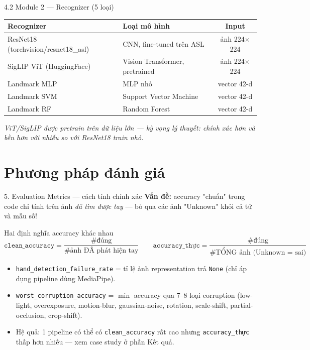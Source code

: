 \documentclass[t, aspectratio=169]{beamer} %
\begin{document}
	\begin{frame}{4.2 Module 2 — Recognizer (5 loại)}
		\begin{table}
			\small
			\centering
			\begin{tabular}{llc}
				\toprule
				\textbf{Recognizer} & \textbf{Loại mô hình} & \textbf{Input} \\
				\midrule
				ResNet18 (torchvision/resnet18\_asl) & CNN, fine-tuned trên ASL & ảnh 224$\times$224 \\
				SigLIP ViT (HuggingFace) & Vision Transformer, pretrained & ảnh 224$\times$224 \\
				Landmark MLP & MLP nhỏ & vector 42-d \\
				Landmark SVM & Support Vector Machine & vector 42-d \\
				Landmark RF & Random Forest & vector 42-d \\
				\bottomrule
			\end{tabular}
		\end{table}
		\vspace{1em}
		\textit{ViT/SigLIP được pretrain trên dữ liệu lớn — kỳ vọng lý thuyết: chính xác hơn và bền hơn với nhiễu so với ResNet18 train nhỏ.}
	\end{frame}

	\useThickBar
	\useStyleLogoOnly
	\section{Phương pháp đánh giá}
	\begin{frame}{5. Evaluation Metrics — cách tính chính xác}
		\textbf{Vấn đề:} accuracy "chuẩn" trong code chỉ tính trên ảnh \textit{đã tìm được tay} — bỏ qua các ảnh "Unknown" khỏi cả tử và mẫu số!

		\begin{block}{Hai định nghĩa accuracy khác nhau}
			\[
				\texttt{clean\_accuracy} = \frac{\#\text{đúng}}{\#\text{ảnh ĐÃ phát hiện tay}} \qquad
				\texttt{accuracy\_thực} = \frac{\#\text{đúng}}{\#\text{TỔNG ảnh (Unknown = sai)}}
			\]
		\end{block}

		\vspace{0.5em}
		\begin{itemize}
			\item \texttt{hand\_detection\_failure\_rate} = tỉ lệ ảnh representation trả \texttt{None} (chỉ áp dụng pipeline dùng MediaPipe).
			\item \texttt{worst\_corruption\_accuracy} = $\min$ accuracy qua 7--8 loại corruption (low-light, overexposure, motion-blur, gaussian-noise, rotation, scale-shift, partial-occlusion, crop-shift).
			\item \alert{Hệ quả:} 1 pipeline có thể có \texttt{clean\_accuracy} rất cao nhưng \texttt{accuracy\_thực} thấp hơn nhiều — xem case study ở phần Kết quả.
		\end{itemize}
	\end{frame}
\end{document}
